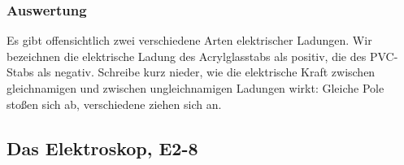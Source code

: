\documentclass{report}
\begin{document}
\subsubsection{Auswertung} Es gibt offensichtlich zwei verschiedene Arten
elektrischer Ladungen. Wir bezeichnen die elektrische Ladung des Acrylglasstabs
als positiv, die des PVC-Stabs als negativ. Schreibe kurz nieder, wie die
elektrische Kraft zwischen gleichnamigen und zwischen ungleichnamigen Ladungen
wirkt: Gleiche Pole stoßen sich ab, verschiedene ziehen sich an.

\subsection{Das Elektroskop, E2-8} 
\end{document}
